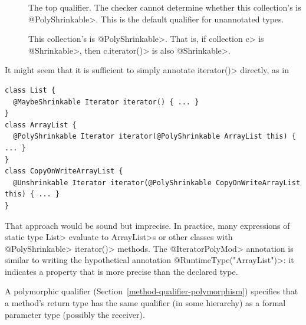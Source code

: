 
\begin{description}
\item[]
The top qualifier.
The checker cannot determine whether this collection's  is
\<@PolyShrinkable>.
This is the default qualifier for unannotated types.

\item[]
This collection's  is \<@PolyShrinkable>.  That is, if
collection \<c> is \<@Shrinkable>, then \<c.iterator()> is also
\<@Shrinkable>.

\end{description}

It might seem that it is sufficient to simply annotate \<iterator()>
directly, as in

\begin{Verbatim}
class List {
  @MaybeShrinkable Iterator iterator() { ... }
}
class ArrayList {
  @PolyShrinkable Iterator iterator(@PolyShrinkable ArrayList this) { ... }
}
class CopyOnWriteArrayList {
  @Unshrinkable Iterator iterator(@PolyShrinkable CopyOnWriteArrayList this) { ... }
}
\end{Verbatim}

That approach would be sound but imprecise.
In practice, many expressions of static type \<List> evaluate to
\<ArrayList>s or other classes with \<@PolyShrinkable> \<iterator()> methods.
The \<@IteratorPolyMod> annotation is similar to writing the hypothetical
annotation \<@RuntimeType("ArrayList")>:  it indicates a property that is
more precise than the declared type.



A polymorphic qualifier (Section~\ref{method-qualifier-polymorphism})
specifies that a method's return type has the
same qualifier (in some hierarchy) as a formal parameter type (possibly
the receiver).

